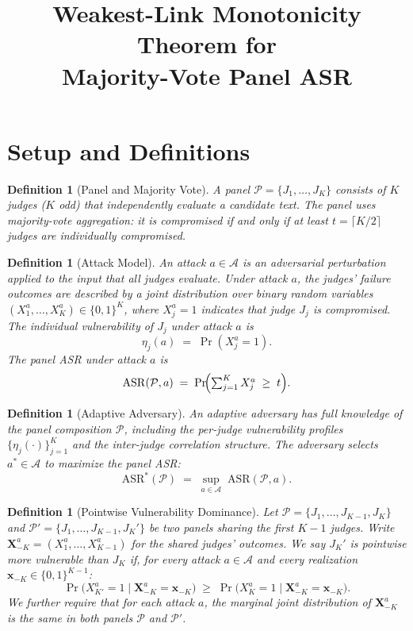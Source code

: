 \documentclass[11pt]{article}
\title{Weakest-Link Monotonicity Theorem for\\Majority-Vote Panel ASR}
\author{}
\date{}
\newtheorem{definition}[theorem]{Definition}
\begin{document}
\maketitle

\section{Setup and Definitions}

\begin{definition}[Panel and Majority Vote]
\label{def:panel}
A \emph{panel} $\mathcal{P} = \{J_1, \ldots, J_K\}$ consists of $K$ judges ($K$ odd) that independently evaluate a candidate text. The panel uses \emph{majority-vote aggregation}: it is \emph{compromised} if and only if at least $t = \lceil K/2 \rceil$ judges are individually compromised.
\end{definition}

\begin{definition}[Attack Model]
\label{def:attack}
An \emph{attack} $a \in \mathcal{A}$ is an adversarial perturbation applied to the input that all judges evaluate. Under attack $a$, the judges' failure outcomes are described by a joint distribution over binary random variables $(X_1^a, \ldots, X_K^a) \in \{0,1\}^K$, where $X_j^a = 1$ indicates that judge $J_j$ is compromised. The \emph{individual vulnerability} of $J_j$ under attack $a$ is
\[
    \eta_j(a) \;=\; \Pr(X_j^a = 1).
\]
The \emph{panel ASR} under attack $a$ is
\[
    \mathrm{ASR}(\mathcal{P}, a) \;=\; \Pr\!\Bigl(\textstyle\sum_{j=1}^K X_j^a \;\geq\; t\Bigr).
\]
\end{definition}

\begin{definition}[Adaptive Adversary]
\label{def:adversary}
An \emph{adaptive adversary} has full knowledge of the panel composition $\mathcal{P}$, including the per-judge vulnerability profiles $\{\eta_j(\cdot)\}_{j=1}^K$ and the inter-judge correlation structure. The adversary selects $a^* \in \mathcal{A}$ to maximize the panel ASR:
\[
    \mathrm{ASR}^*(\mathcal{P}) \;=\; \sup_{a \in \mathcal{A}}\; \mathrm{ASR}(\mathcal{P}, a).
\]
\end{definition}

\begin{definition}[Pointwise Vulnerability Dominance]
\label{def:dominance}
Let $\mathcal{P} = \{J_1, \ldots, J_{K-1}, J_K\}$ and $\mathcal{P}' = \{J_1, \ldots, J_{K-1}, J_K'\}$ be two panels sharing the first $K-1$ judges. Write $\mathbf{X}_{-K}^a = (X_1^a, \ldots, X_{K-1}^a)$ for the shared judges' outcomes. We say $J_K'$ is \emph{pointwise more vulnerable} than $J_K$ if, for every attack $a \in \mathcal{A}$ and every realization $\mathbf{x}_{-K} \in \{0,1\}^{K-1}$:
\[
    \Pr\bigl(X_{K'}^a = 1 \;\big|\; \mathbf{X}_{-K}^a = \mathbf{x}_{-K}\bigr) \;\geq\; \Pr\bigl(X_K^a = 1 \;\big|\; \mathbf{X}_{-K}^a = \mathbf{x}_{-K}\bigr).
\]
We further require that for each attack $a$, the marginal joint distribution of $\mathbf{X}_{-K}^a$ is the same in both panels $\mathcal{P}$ and $\mathcal{P}'$.
\end{definition}
\end{document}
